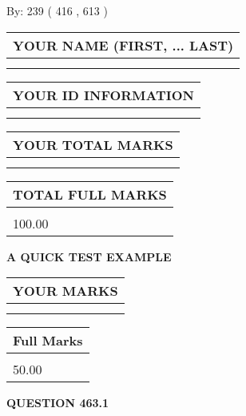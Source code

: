 \documentclass[12pt]{article}
\begin{document}
   
\hspace{1.0in} By: 
 239 ( 416 ,  613 )
   
   
   
   
\newpage 
\setcounter{page}{ 
   463001 } 
   
   
   
   
\noindent\begin{tabular}{|l|}
\hline
YOUR NAME (FIRST, ... LAST)  \\
\hline
 \\ 
 \\ 
\hline
\end{tabular}
\hspace{0.05in} \begin{tabular}{|l|}
\hline
 YOUR   ID   INFORMATION  \\
\hline
 \\ 
 \\ 
\hline
\end{tabular}
   
   
\vspace{0.2in}\noindent\begin{tabular}{|l|}
\hline
YOUR TOTAL MARKS  \\
\hline
 \\ 
 \\ 
\hline
\end{tabular}
\hspace{0.05in} \begin{tabular}{|l|}
\hline
TOTAL FULL MARKS  \\
\hline
 \\ 
100.00 \\
\hline
\end{tabular}
   
   
 \vspace{0.2in}
{\LARGE {\textbf{ A QUICK TEST EXAMPLE}}}
   
   
  
\vspace{0.2in}
  
\noindent\begin{tabular}{|l|}
\hline
 YOUR MARKS  \\
\hline
 \\ 
 \\ 
\hline
\end{tabular}
\hspace{0.05in} \begin{tabular}{|l|}
\hline
 Full Marks  \\
\hline
 \\ 
50.00 \\
\hline
\end{tabular}
{\textbf{\Large{QUESTION
463.1 
}}}
  
\end{document}
